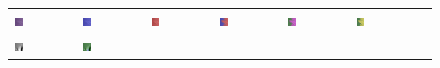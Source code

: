 \begin{figure}[h!]
\begin{tabular}{C{0.14\textwidth}C{0.14\textwidth}C{0.14\textwidth}C{0.14\textwidth}C{0.14\textwidth}C{0.14\textwidth}C{0.14\textwidth}}
		\includegraphics[width=0.14\textwidth]{images/gen/number_of_segments/p03_03.png_5.png} &
		\includegraphics[width=0.14\textwidth]{images/gen/number_of_segments/p03_03.png_10.png} &
		\includegraphics[width=0.14\textwidth]{images/gen/number_of_segments/p03_03.png_20.png} &
		\includegraphics[width=0.14\textwidth]{images/gen/number_of_segments/p03_03.png_50.png} &
		\includegraphics[width=0.14\textwidth]{images/gen/number_of_segments/p03_03.png_75.png} &
		\includegraphics[width=0.14\textwidth]{images/gen/number_of_segments/p03_03.png_100.png} \\
		\includegraphics[width=0.14\textwidth]{images/p03/p03_04.png} &
		\includegraphics[width=0.14\textwidth]{images/gen/number_of_segments/p03_04.png_5.png} &

\end{tabular}
\end{figure}
